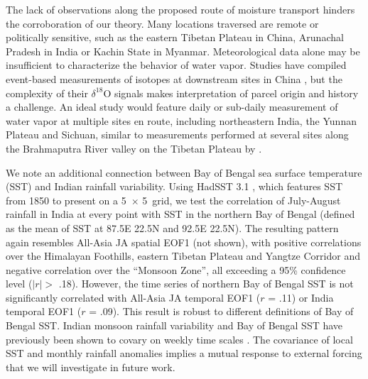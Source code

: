 	The lack of observations along the proposed route of moisture transport hinders the corroboration of our theory. Many locations traversed are remote or politically sensitive, such as the eastern Tibetan Plateau in China, Arunachal Pradesh in India or Kachin State in Myanmar. Meteorological data alone may be insufficient to characterize the behavior of water vapor. Studies have compiled event-based measurements of isotopes at downstream sites in China \citep{Yang2011a,Wu2014}, but the complexity of their $\delta ^{18}$O signals makes interpretation of parcel origin and history a challenge. An ideal study would feature daily or sub-daily measurement of water vapor at multiple sites en route, including northeastern India, the Yunnan Plateau and Sichuan, similar to measurements performed at several sites along the Brahmaputra River valley on the Tibetan Plateau by \cite{Gao2011}.
	
	We note an additional connection between Bay of Bengal sea surface temperature (SST) and Indian rainfall variability. Using HadSST 3.1 \citep{Kennedy2011a,Kennedy2011}, which features SST from 1850 to present on a 5\textdegree\ $\times$ 5\textdegree\ grid, we test the correlation of July-August rainfall in India at every point with SST in the northern Bay of Bengal (defined as the mean of SST at 87.5\textdegree E 22.5\textdegree N and 92.5\textdegree E 22.5\textdegree N). The resulting pattern again resembles All-Asia JA spatial EOF1 (not shown), with positive correlations over the Himalayan Foothills, eastern Tibetan Plateau and Yangtze Corridor and negative correlation over the ``Monsoon Zone'', all exceeding a 95\% confidence level ($\lvert r \rvert >$ .18). However, the time series of northern Bay of Bengal SST is not significantly correlated with All-Asia JA temporal EOF1 ($r$ = .11) or India temporal EOF1 ($r$ = .09). This result is robust to different definitions of Bay of Bengal SST. Indian monsoon rainfall variability and Bay of Bengal SST have previously been shown to covary on weekly time scales \citep{Vecchi2002,Han2006}. The covariance of local SST and monthly rainfall anomalies implies a mutual response to external forcing that we will investigate in future work.
	
